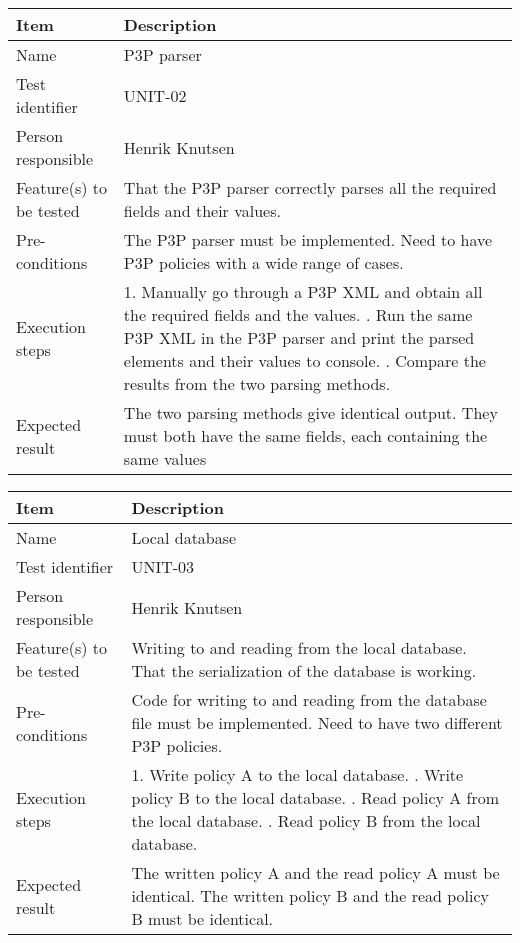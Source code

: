 		\begin{center}
			\begin{tabular}{ |  p{3.5cm} | p{10cm} | }
				\hline
				Item & Description \\ [5pt] \hline \hline
				Name & P3P parser \\  [5pt] \hline
				Test identifier & UNIT-02 \\  [5pt] \hline
				Person responsible & Henrik Knutsen \\  [5pt] \hline
				Feature(s) to be tested & That the P3P parser correctly parses all the required fields and their values. \\  [5pt] \hline
				Pre-conditions & The P3P parser must be implemented. Need to have P3P policies with a wide range of cases. \\  [5pt] \hline
				Execution steps & 1. Manually go through a P3P XML and obtain all the required fields and the values. \newline 2. Run the same P3P XML in the P3P parser and print the parsed elements and their values to console.
					\newline 3. Compare the results from the two parsing methods. \\  [5pt] \hline
				Expected result & The two parsing methods give identical output. They must both have the same fields, each containing the same values \\  [5pt] \hline
			\end{tabular}
		\end{center}
		
		\begin{center}
			\begin{tabular}{ |  p{3.5cm} | p{10cm} | }
				\hline
				Item & Description \\ [5pt] \hline \hline
				Name & Local database \\  [5pt] \hline
				Test identifier & UNIT-03 \\  [5pt] \hline
				Person responsible & Henrik Knutsen \\  [5pt] \hline
				Feature(s) to be tested & Writing to and reading from the local database. That the serialization of the database is working. \\  [5pt] \hline
				Pre-conditions & Code for writing to and reading from the database file must be implemented. Need to have two different P3P policies. \\  [5pt] \hline
				Execution steps & 1. Write policy A to the local database. \newline 2. Write policy B to the local database. \newline 3. Read policy A from the local database. \newline 4. Read policy B from the local database. \\  [5pt] \hline
				Expected result & The written policy A and the read policy A must be identical. \newline The written policy B and the read policy B must be identical. \\  [5pt] \hline
			\end{tabular}
		\end{center}

